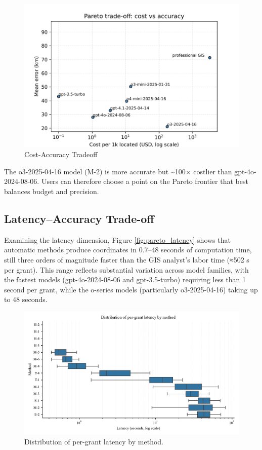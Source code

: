 \begin{figure}
\centering
\includegraphics[width=\textwidth,height=0.8\textheight,keepaspectratio]{figures/pareto_tradeoff.pdf}
\caption{Cost-Accuracy Tradeoff}\label{fig:pareto_cost}
\end{figure}

The o3-2025-04-16 model (M-2) is more accurate but \textasciitilde100×
costlier than gpt-4o-2024-08-06. Users can therefore choose a point on
the Pareto frontier that best balances budget and precision.

\subsection{Latency--Accuracy
Trade-off}\label{latencyaccuracy-trade-off}

Examining the latency dimension, Figure \ref{fig:pareto_latency} shows
that automatic methods produce coordinates in 0.7--48 seconds of
computation time, still three orders of magnitude faster than the GIS
analyst's labor time (≈502 s per grant). This range reflects substantial
variation across model families, with the fastest models
(gpt-4o-2024-08-06 and gpt-3.5-turbo) requiring less than 1 second per
grant, while the o-series models (particularly o3-2025-04-16) taking up
to 48 seconds.

\begin{figure}[H]
\centering
\includegraphics[width=0.75\linewidth]{figures/latency_boxplot.pdf}
\caption{Distribution of per-grant latency by method.}
\label{fig:latency_box}
\end{figure}

